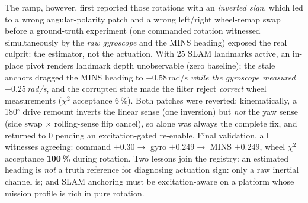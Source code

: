 The ramp, however, first reported those rotations with an \emph{inverted
sign}, which led to a wrong angular-polarity patch and a wrong left/right
wheel-remap swap before a ground-truth experiment (one commanded
rotation witnessed simultaneously by the \emph{raw gyroscope} and the MINS
heading) exposed the real culprit: the estimator, not the actuation.
With 25 SLAM landmarks active, an in-place pivot renders landmark depth
unobservable (zero baseline); the stale anchors dragged the MINS heading to
$+0.58$\,rad/s \emph{while the gyroscope measured $-0.25$\,rad/s}, and
the corrupted state made the filter reject \emph{correct} wheel
measurements ($\chi^2$ acceptance 6\,\%). Both patches were reverted:
kinematically, a 180$^\circ$ drive remount inverts the linear sense (one
inversion) but \emph{not} the yaw sense (side swap $\times$ rolling-sense
flip cancel), so  alone was always the complete
fix, and  returned to 0 pending an excitation-gated
re-enable. Final validation, all witnesses agreeing: command
$+0.30 \rightarrow$ gyro $+0.249 \rightarrow$ MINS $+0.249$, wheel
$\chi^2$ acceptance \textbf{100\,\%} during rotation. Two lessons join
the registry: an estimated heading is \emph{not} a truth reference for
diagnosing actuation sign: only a raw inertial channel is; and SLAM
anchoring must be excitation-aware on a platform whose mission profile is
rich in pure rotation.

